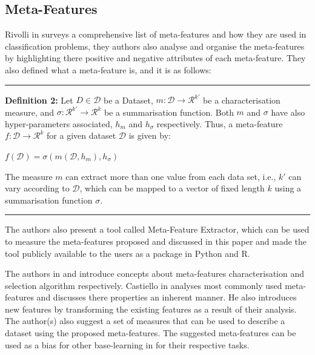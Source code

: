 \subsection*{Meta-Features}

Rivolli in \citep{meta-features-3} surveys a comprehensive list of meta-features and how they are used in classification problems, they authors also analyse and organise the meta-features by highlighting there positive and negative attributes of each meta-feature. They also defined what a meta-feature is, and it is as follows:

\par\noindent\rule{\textwidth}{0.4pt}\newline
\textbf{Definition 2:} Let ${\displaystyle{D \in \mathcal{D} }}$ be a Dataset, ${\displaystyle{m: \mathcal{D} \to \mathcal{R}^{k'}}}$ be a characterisation measure, and $\displaystyle{\sigma: \mathcal{R}^{k'} \to \mathcal{R}^{k}}$ be a summarisation function. Both $\displaystyle{m}$ and $\sigma$ have also hyper-parameters associated, $h_m$ and $h_\sigma$ respectively. Thus, a meta-feature $\displaystyle{f: \mathcal{D} \to \mathcal{R}^{k}}$ for a given dataset $\displaystyle{\mathcal{D}}$ is given by:

\begin{center}
    $\displaystyle{f(\mathcal{D}) = \sigma(m(\mathcal{D}, h_m), h_\sigma)}$
\end{center}
\newpage
The measure $\displaystyle{m}$ can extract more than one value from each data set, i.e., $\displaystyle{k'}$ can vary according to $\displaystyle{\mathcal{D}}$, which can be mapped to a vector of fixed length $\displaystyle{k}$ using a summarisation function $\displaystyle{\sigma}$.

\par\noindent\rule{\textwidth}{0.4pt}

The authors also present a tool called Meta-Feature Extractor, which can be used to measure the meta-features proposed and discussed in this paper and made the tool publicly available to the users as a package in Python and R.

The authors in \citep{meta-features-1} and \citep{meta-features-2} introduce concepts about meta-features characterisation and selection algorithm respectively. Castiello in \citep{meta-features-1} analyses most commonly used meta-features and discusses there properties an inherent manner. He also introduces new features by transforming the existing features as a result of their analysis. The author(s) also suggest a set of measures that can be used to describe a dataset using the proposed meta-features. The suggested meta-features can be used as a bias for other base-learning in for their respective tasks. 

